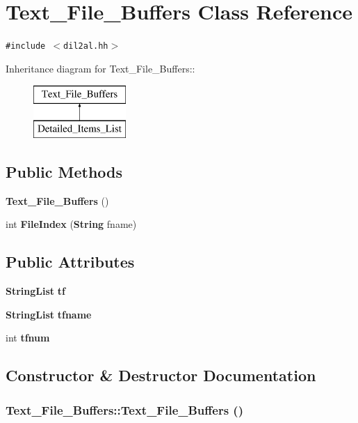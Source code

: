 \section{Text\_\-File\_\-Buffers  Class Reference}
\label{classText__File__Buffers}
{\tt \#include $<$dil2al.hh$>$}

Inheritance diagram for Text\_\-File\_\-Buffers::\begin{figure}[H]
\begin{center}
\leavevmode
\includegraphics[height=2cm]{classText__File__Buffers}
\end{center}
\end{figure}
\subsection*{Public Methods}
\begin{CompactItemize}
\item 
{\bf Text\_\-File\_\-Buffers} ()
\item 
int {\bf File\-Index} ({\bf String} fname)
\end{CompactItemize}
\subsection*{Public Attributes}
\begin{CompactItemize}
\item 
{\bf String\-List} {\bf tf}
\item 
{\bf String\-List} {\bf tfname}
\item 
int {\bf tfnum}
\end{CompactItemize}


\subsection{Constructor \& Destructor Documentation}
\subsubsection{\setlength{\rightskip}{0pt plus 5cm}Text\_\-File\_\-Buffers::Text\_\-File\_\-Buffers ()\hspace{0.3cm}{\tt  [inline]}}\label{classText__File__Buffers_a0}




